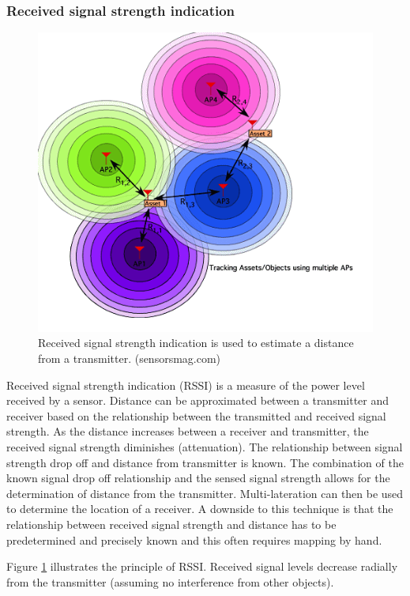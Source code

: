 \documentclass[11pt,a4paper]{report}
\begin{document}
		\subsubsection{Received signal strength indication}
			\begin{figure}[H]
				\centering
				\includegraphics[width=1\textwidth]{rssi}
				\caption[RSSI]{Received signal strength indication is used to estimate a distance from a transmitter. (sensorsmag.com)}
				\label{fig:rssi}
			\end{figure}
			Received signal strength indication (RSSI) is a measure of the power level received by a sensor. Distance can be approximated between a transmitter and receiver based on the relationship between the transmitted and received signal strength. As the distance increases between a receiver and transmitter, the received signal strength diminishes (attenuation). The relationship between signal strength drop off and distance from transmitter is known. The combination of the known signal drop off relationship and the sensed signal strength allows for the determination of distance from the transmitter. Multi-lateration can then be used to determine the location of a receiver.
			A downside to this technique is that the relationship between received signal strength and distance has to be predetermined and precisely known and this often requires mapping by hand.
			
			Figure \ref{fig:rssi} illustrates the principle of RSSI. Received signal levels decrease radially from the transmitter (assuming no interference from other objects).
		
\end{document}
